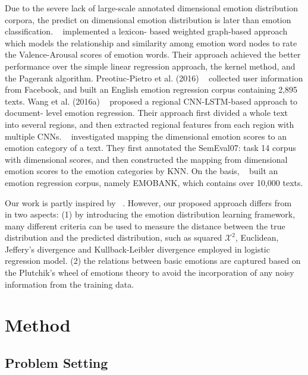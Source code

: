 Due to the severe lack of 
large-scale annotated dimensional emotion distribution corpora,
the predict on dimensional emotion distribution is
later than emotion classification.
~\cite{Yu2015} 
implemented a lexicon- based weighted graph-based approach 
which models the relationship and 
similarity among emotion word nodes 
to rate the Valence-Arousal scores of emotion words. 
Their approach achieved
the better performance over 
the simple linear regression approach, 
the kernel method, and the Pagerank algorithm. 
Preotiuc-Pietro et al. (2016) 
~\cite{Preotiuc-Pietro2016}
collected user information from Facebook, 
and built an English emotion regression corpus 
containing 2,895 texts. 
Wang et al. (2016a) 
~\cite{Jin2016}
proposed a regional CNN-LSTM-based approach 
to document- level emotion regression. 
Their approach first divided a whole text into 
several regions, 
and then extracted regional features 
from each region with multiple CNNs. 
~\cite{Buechel2016}
investigated mapping the dimensional emotion scores to 
an emotion category of a text. 
They first annotated the SemEval07: 
task 14 corpus with dimensional scores, 
and then constructed the mapping 
from dimensional emotion scores to the emotion categories 
by KNN. 
On the basis, 
~\cite{buechel-hahn-2017-emobank}
built an emotion regression corpus, 
namely EMOBANK, 
which contains over 10,000 texts.

Our work is partly inspired by 
~\cite{zhu-etal-2019-adversarial}.
However, our proposed approach differs from 
~\cite{zhu-etal-2019-adversarial}
in two aspects: 
(1) by introducing the
emotion distribution learning framework,
many different criteria can be used to measure the distance
between the true distribution and the predicted distribution,
such as squared $\mathcal{X}^{2}$, Euclidean, Jeffery’s
divergence and Kullback-Leibler divergence
employed in logistic regression model.
(2) the relations between basic emotions are
 captured based on the Plutchik’s wheel of emotions theory to 
 avoid the incorporation of any noisy information 
 from the training data.



\section{Method} \label{sec-method}

\subsection{Problem Setting}
\

